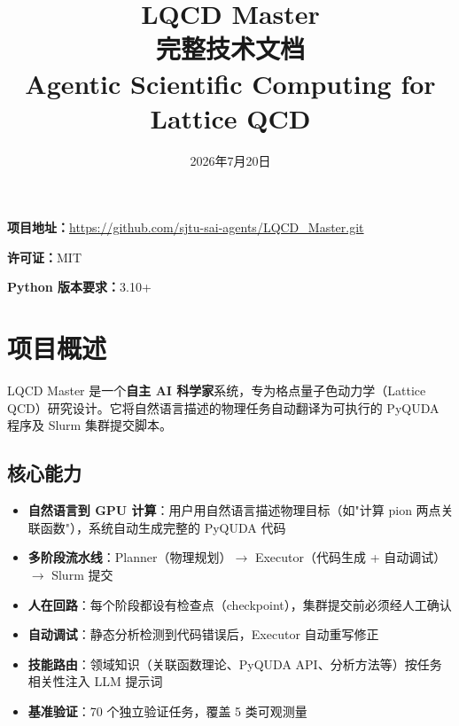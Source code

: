 \documentclass[12pt,a4paper]{ctexart}
\title{{\Huge\bfseries LQCD Master}\\[4pt]
       {\large 完整技术文档}\\[4pt]
       {\normalsize Agentic Scientific Computing for Lattice QCD}}
\author{}
\date{2026年7月20日}
\begin{document}
\maketitle
\thispagestyle{empty}

\vspace{2cm}
\begin{center}
\begin{tcolorbox}[width=0.85\textwidth,boxrule=0.8pt,colback=blue!3!white,colframe=blue!40!black]
\centering
\textbf{项目地址：}\url{https://github.com/sjtu-sai-agents/LQCD_Master.git}

\textbf{许可证：}MIT

\textbf{Python 版本要求：}3.10+
\end{tcolorbox}
\end{center}

\newpage
\tableofcontents
\newpage

\section{项目概述}

LQCD Master 是一个\textbf{自主 AI 科学家}系统，专为格点量子色动力学（Lattice QCD）研究设计。它将自然语言描述的物理任务自动翻译为可执行的 PyQUDA 程序及 Slurm 集群提交脚本。

\subsection{核心能力}

\begin{itemize}[itemsep=4pt]
    \item \textbf{自然语言到 GPU 计算}：用户用自然语言描述物理目标（如"计算 pion 两点关联函数"），系统自动生成完整的 PyQUDA 代码
    \item \textbf{多阶段流水线}：Planner（物理规划）$\rightarrow$ Executor（代码生成 + 自动调试）$\rightarrow$ Slurm 提交
    \item \textbf{人在回路}：每个阶段都设有检查点（checkpoint），集群提交前必须经人工确认
    \item \textbf{自动调试}：静态分析检测到代码错误后，Executor 自动重写修正
    \item \textbf{技能路由}：领域知识（关联函数理论、PyQUDA API、分析方法等）按任务相关性注入 LLM 提示词
    \item \textbf{基准验证}：70 个独立验证任务，覆盖 5 类可观测量
\end{itemize}
\end{document}

